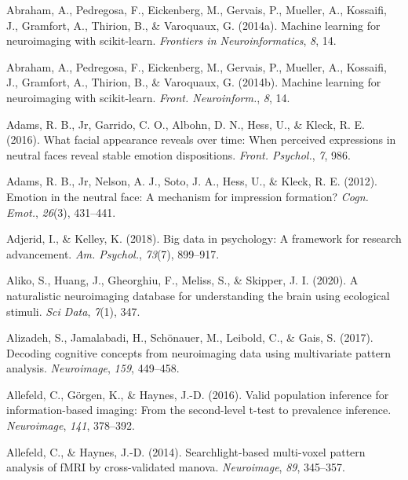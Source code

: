 \documentclass[11pt,american,]{memoir} %
\begin{document}
\leavevmode\hypertarget{ref-abraham2014machine}{}%
Abraham, A., Pedregosa, F., Eickenberg, M., Gervais, P., Mueller, A., Kossaifi, J., Gramfort, A., Thirion, B., \& Varoquaux, G. (2014a). Machine learning for neuroimaging with scikit-learn. \emph{Frontiers in Neuroinformatics}, \emph{8}, 14.

\leavevmode\hypertarget{ref-Abraham2014-ef}{}%
Abraham, A., Pedregosa, F., Eickenberg, M., Gervais, P., Mueller, A., Kossaifi, J., Gramfort, A., Thirion, B., \& Varoquaux, G. (2014b). Machine learning for neuroimaging with scikit-learn. \emph{Front. Neuroinform.}, \emph{8}, 14.

\leavevmode\hypertarget{ref-Adams2016-tz}{}%
Adams, R. B., Jr, Garrido, C. O., Albohn, D. N., Hess, U., \& Kleck, R. E. (2016). What facial appearance reveals over time: When perceived expressions in neutral faces reveal stable emotion dispositions. \emph{Front. Psychol.}, \emph{7}, 986.

\leavevmode\hypertarget{ref-Adams2012-dl}{}%
Adams, R. B., Jr, Nelson, A. J., Soto, J. A., Hess, U., \& Kleck, R. E. (2012). Emotion in the neutral face: A mechanism for impression formation? \emph{Cogn. Emot.}, \emph{26}(3), 431--441.

\leavevmode\hypertarget{ref-Adjerid2018-vs}{}%
Adjerid, I., \& Kelley, K. (2018). Big data in psychology: A framework for research advancement. \emph{Am. Psychol.}, \emph{73}(7), 899--917.

\leavevmode\hypertarget{ref-Aliko2020-ry}{}%
Aliko, S., Huang, J., Gheorghiu, F., Meliss, S., \& Skipper, J. I. (2020). A naturalistic neuroimaging database for understanding the brain using ecological stimuli. \emph{Sci Data}, \emph{7}(1), 347.

\leavevmode\hypertarget{ref-alizadeh2017decoding}{}%
Alizadeh, S., Jamalabadi, H., Schönauer, M., Leibold, C., \& Gais, S. (2017). Decoding cognitive concepts from neuroimaging data using multivariate pattern analysis. \emph{Neuroimage}, \emph{159}, 449--458.

\leavevmode\hypertarget{ref-Allefeld2016-xp}{}%
Allefeld, C., Görgen, K., \& Haynes, J.-D. (2016). Valid population inference for information-based imaging: From the second-level t-test to prevalence inference. \emph{Neuroimage}, \emph{141}, 378--392.

\leavevmode\hypertarget{ref-allefeld2014searchlight}{}%
Allefeld, C., \& Haynes, J.-D. (2014). Searchlight-based multi-voxel pattern analysis of fMRI by cross-validated manova. \emph{Neuroimage}, \emph{89}, 345--357.
\end{document}
